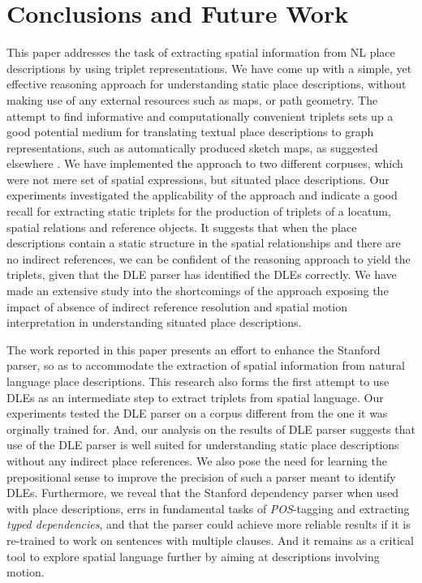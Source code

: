 \documentclass[letter]{sig-alternate}
\begin{document}
\section{Conclusions and Future Work}
\label{sec:conclusion}
This paper addresses the task of extracting spatial information from NL place descriptions by using triplet representations. We have come up with a simple, yet effective reasoning approach for understanding static place descriptions, without making use of any external resources such as maps, or path geometry. The attempt to find informative and computationally convenient triplets sets up a good potential medium for translating textual place descriptions to graph representations, such as automatically produced sketch maps, as suggested elsewhere \cite{maria:descriptions}. We have implemented the approach to two different corpuses, which were not mere set of spatial expressions, but situated place descriptions. Our experiments investigated the applicability of the approach and indicate a good recall for extracting static triplets for the production of triplets of a locatum, spatial relations and reference objects. It suggests that when the place descriptions contain a static structure in the spatial relationships and there are no indirect references, we can be confident of the reasoning approach to yield the triplets, given that the DLE parser has identified the DLEs correctly. We have made an extensive study into the shortcomings of the approach exposing the impact of absence of indirect reference resolution and spatial motion interpretation in understanding situated place descriptions. 

The work reported in this paper presents an effort to enhance the Stanford parser, so as to accommodate the extraction of spatial information from natural language place descriptions.
This research also forms the first attempt to use DLEs as an intermediate step to extract triplets from spatial language. Our experiments tested the DLE parser on a corpus different from the one it was orginally trained for. And, our analysis on the results of DLE parser suggests that use of the DLE parser is well suited for understanding static place descriptions without any indirect place references. We also pose the need for learning the prepositional sense to improve the precision of such a parser meant to identify DLEs. Furthermore, we reveal that the Stanford dependency parser when used with place descriptions, errs in fundamental tasks of \textit{POS}-tagging and extracting \textit{typed dependencies}, and that the parser could achieve more reliable results if it is re-trained to work on sentences with multiple clauses. And it remains as a critical tool to explore spatial language further by aiming at descriptions involving motion.
\end{document}
